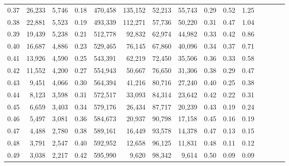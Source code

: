 \begin{tabular}{rrrcrrrrrrrrrrr}
0.37 &  26,233 &  5,746 &                                       0.18 &  470,458 &  135,152 &   52,213 &   55,743 &  0.29 &  0.52 &                         1.25 \\
0.38 &  22,881 &  5,523 &                                       0.19 &  493,339 &  112,271 &   57,736 &   50,220 &  0.31 &  0.47 &                         1.04 \\
0.39 &  19,439 &  5,238 &                                       0.21 &  512,778 &   92,832 &   62,974 &   44,982 &  0.33 &  0.42 &                         0.86 \\
0.40 &  16,687 &  4,886 &                                       0.23 &  529,465 &   76,145 &   67,860 &   40,096 &  0.34 &  0.37 &                         0.71 \\
0.41 &  13,926 &  4,590 &                                       0.25 &  543,391 &   62,219 &   72,450 &   35,506 &  0.36 &  0.33 &                         0.58 \\
0.42 &  11,552 &  4,200 &                                       0.27 &  554,943 &   50,667 &   76,650 &   31,306 &  0.38 &  0.29 &                         0.47 \\
0.43 &   9,451 &  4,066 &                                       0.30 &  564,394 &   41,216 &   80,716 &   27,240 &  0.40 &  0.25 &                         0.38 \\
0.44 &   8,123 &  3,598 &                                       0.31 &  572,517 &   33,093 &   84,314 &   23,642 &  0.42 &  0.22 &                         0.31 \\
0.45 &   6,659 &  3,403 &                                       0.34 &  579,176 &   26,434 &   87,717 &   20,239 &  0.43 &  0.19 &                         0.24 \\
0.46 &   5,497 &  3,081 &                                       0.36 &  584,673 &   20,937 &   90,798 &   17,158 &  0.45 &  0.16 &                         0.19 \\
0.47 &   4,488 &  2,780 &                                       0.38 &  589,161 &   16,449 &   93,578 &   14,378 &  0.47 &  0.13 &                         0.15 \\
0.48 &   3,791 &  2,547 &                                       0.40 &  592,952 &   12,658 &   96,125 &   11,831 &  0.48 &  0.11 &                         0.12 \\
0.49 &   3,038 &  2,217 &                                       0.42 &  595,990 &    9,620 &   98,342 &    9,614 &  0.50 &  0.09 &                         0.09 \\

\end{tabular}
